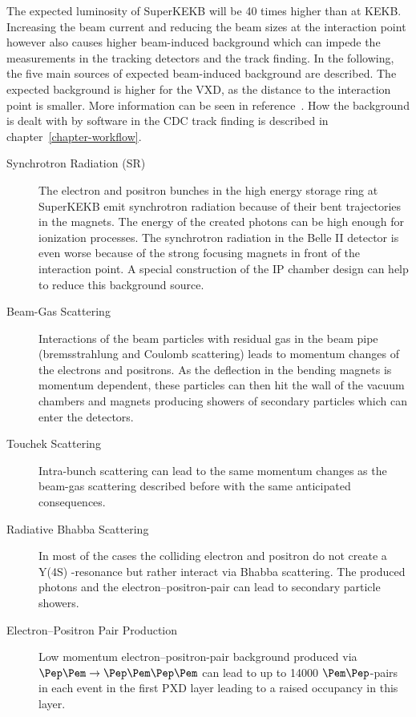 The expected luminosity of SuperKEKB will be 40 times higher than at KEKB. Increasing the beam current and reducing the beam sizes at the interaction point however also causes higher beam-induced background which can impede the measurements in the tracking detectors and the track finding. In the following, the five main sources of expected beam-induced background are described. The expected background is higher for the VXD, as the distance to the interaction point is smaller. More information can be seen in reference~\cite{jakob}. How the background is dealt with by software in the CDC track finding is described in chapter~\ref{chapter-workflow}.

\begin{description}
 \item[Synchrotron Radiation (SR)] The electron and positron bunches in the high energy storage ring at SuperKEKB emit synchrotron radiation because of their bent trajectories in the magnets. The energy of the created photons can be high enough for ionization processes. The synchrotron radiation in the Belle II detector is even worse because of the strong focusing magnets in front of the interaction point. A special construction of the IP chamber design can help to reduce this background source.
 \item[Beam-Gas Scattering] Interactions of the beam particles with residual gas in the beam pipe (bremsstrahlung and Coulomb scattering) leads to momentum changes of the electrons and positrons. As the deflection in the bending magnets is momentum dependent, these particles can then hit the wall of the vacuum chambers and magnets producing showers of secondary particles which can enter the detectors.
 \item[Touchek Scattering] Intra-bunch scattering can lead to the same momentum changes as the beam-gas scattering described before with the same anticipated consequences.
 \item[Radiative Bhabba Scattering] In most of the cases the colliding electron and positron do not create a Y(4S) -resonance but rather interact via Bhabba scattering. The produced photons and the electron--positron-pair can lead to secondary particle showers.
 \item[Electron--Positron Pair Production] Low momentum electron--positron-pair background produced via $\Pep \Pem \to \Pep \Pem \Pep \Pem$ can lead to up to 14000 $\Pem\Pep$-pairs in each event in the first PXD layer leading to a raised occupancy in this layer.
\end{description}
